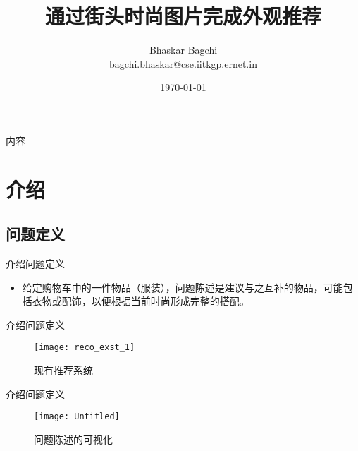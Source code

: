 \documentclass[10pt]{beamer}
\title[] %
{ %
      \textbf{通过街头时尚图片完成外观推荐}
}
\subtitle[Complete The Look Recommendation]
{
}
\author[Bhaskar Bagchi]
{      Bhaskar Bagchi \\
      {\ttfamily bagchi.bhaskar@cse.iitkgp.ernet.in}
}
\institute[]
{
      计算机科学与工程系\\
      印度技术学院，哈拉格布尔\\

}
\date{\today}
\newcommand{\chref}[2]{
  \href{#1}{{\usebeamercolor[bg]{Feather}#2}}
}
\begin{document}

{\1%
\begin{frame} %
  \titlepage %
\end{frame}}


\begin{frame}{内容}{}
\tableofcontents
\end{frame}

\section{介绍}
\subsection{问题定义}
\begin{frame}{介绍}{问题定义}

  \begin{itemize}
    \item<1-> 给定购物车中的一件物品（服装），问题陈述是建议与之互补的物品，可能包括衣物或配饰，以便根据当前时尚形成完整的搭配。
  \end{itemize}
\end{frame}

\begin{frame}{介绍}{问题定义}
\begin{figure}[t]
    \centering
    \texttt{[image: reco\_exst\_1]}
    \caption{现有推荐系统}
  \end{figure}
\end{frame}

\begin{frame}{介绍}{问题定义}
\begin{figure}[t]
    \centering
    \texttt{[image: Untitled]}
    \caption{问题陈述的可视化}
  \end{figure}
\end{frame}
\end{document}
